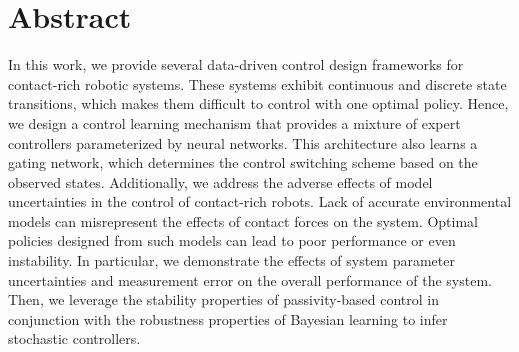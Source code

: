 \chapter*{Abstract}

In this work, we provide several data-driven control design frameworks for
contact-rich robotic systems.
%
These systems exhibit continuous and discrete state transitions, which makes
them difficult to control with one optimal policy.
%
Hence, we design a control learning mechanism that provides a mixture of expert
controllers parameterized by neural networks. 
%
This architecture also learns a gating network, which determines the control
switching scheme based on the observed states.
%
Additionally, we address the adverse effects of model uncertainties in the
control of contact-rich robots.
%
Lack of accurate environmental models can misrepresent the effects of contact
forces on the system.
%
Optimal policies designed from such models can lead to poor performance or even
instability.
%
In particular, we demonstrate the effects of system parameter uncertainties and 
measurement error on the overall performance of the system.
%
Then, we leverage the stability properties of passivity-based control in
conjunction with the robustness properties of Bayesian learning to infer
stochastic controllers.
%



